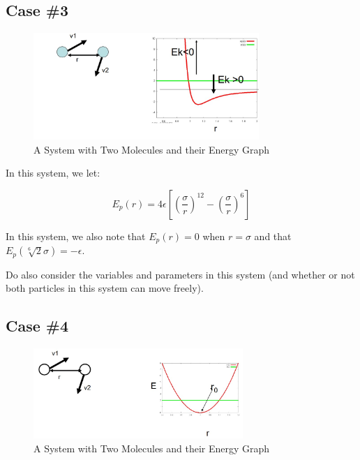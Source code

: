 \documentclass[
  letterpaper,
  DIV=11,
  numbers=noendperiod]{scrreprt}
\begin{document}
\hypertarget{case-3}{%
\subsection{Case \#3}\label{case-3}}

\begin{figure}

{\centering \includegraphics[width=3.36in,height=\textheight]{./images/wk1/sys3.jpg}

}

\caption{A System with Two Molecules and their Energy Graph}

\end{figure}

In this system, we let:

\begin{equation}
  E_p(r) = 4\epsilon\left[\left(\frac{\sigma}{r}\right)^{12} - \left(\frac{\sigma}{r}\right)^6\right]
\end{equation}

In this system, we also note that \(E_p(r) = 0\) when \(r = \sigma\) and
that \(\displaystyle E_p(\sqrt[6]{2}\sigma) = -\epsilon\).

Do also consider the variables and parameters in this system (and
whether or not both particles in this system can move freely).

\hypertarget{case-4}{%
\subsection{Case \#4}\label{case-4}}

\begin{figure}

{\centering \includegraphics[width=3.13in,height=\textheight]{./images/wk1/sys4.jpg}

}

\caption{A System with Two Molecules and their Energy Graph}

\end{figure}
\end{document}
